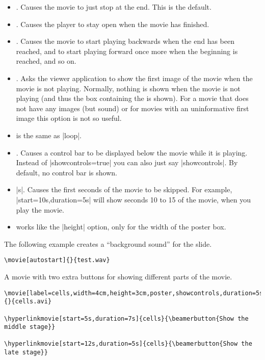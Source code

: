 \begin{command}{\movie{}}
\begin{itemize}
    . Causes the movie to start again when the end has
    been reached. Normally, the movie just stops at the end.
  \item
    . Causes the movie to just stop at the end. This is
    the default.
  \item
    . Causes the player to stay open when the movie
    has finished.
  \item
    . Causes the movie to start playing backwards
    when the end has been reached, and to start playing forward once
    more when the beginning is reached, and so on.
  \item
    . Asks the viewer application to show the first
    image of the movie when the movie is not playing. Normally,
    nothing is shown when the movie is not playing (and thus the box
    containing the  is shown). For a movie that does
    not have any images (but sound) or for movies with an
    uninformative first image this option is not so useful.
  \item
     is the same as |loop|.
  \item
    . Causes a control bar
    to be displayed below the movie while it is playing. Instead of
    |showcontrols=true| you can also just say |showcontrols|. By
    default, no control bar is shown.
  \item
    |s|. Causes the first
     seconds of the movie to be skipped. For example,
    |start=10s,duration=5s| will show seconds 10 to 15 of the movie,
    when you play the movie.
  \item
     works like the |height|
    option, only for the width of the poster box.
  \end{itemize}

  \example The following example creates a ``background sound'' for
  the slide.
\begin{verbatim}
\movie[autostart]{}{test.wav}
\end{verbatim}

  \example A movie with two extra buttons for showing different parts
  of the movie.
\begin{verbatim}
\movie[label=cells,width=4cm,height=3cm,poster,showcontrols,duration=5s]{}{cells.avi}

\hyperlinkmovie[start=5s,duration=7s]{cells}{\beamerbutton{Show the middle stage}}

\hyperlinkmovie[start=12s,duration=5s]{cells}{\beamerbutton{Show the late stage}}
\end{verbatim}
\end{command}

